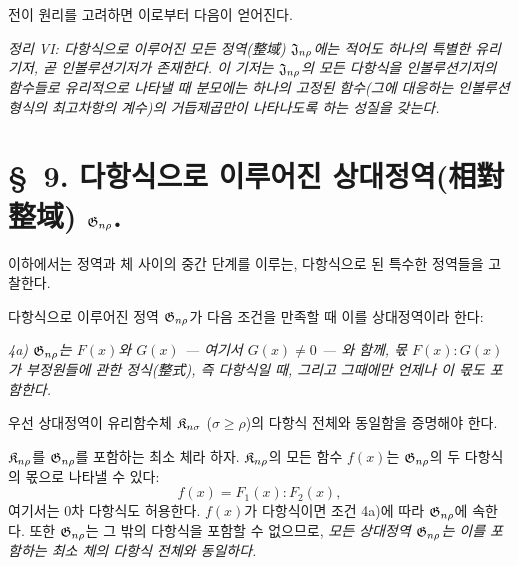 전이 원리를 고려하면 이로부터 다음이 얻어진다.

\emph{정리 VI: 다항식으로 이루어진 모든 정역(整域) $\mathfrak J_{n\rho}$에는 적어도 하나의 특별한 유리기저, 곧 인볼루션기저가 존재한다. 이 기저는 $\mathfrak J_{n\rho}$의 모든 다항식을 인볼루션기저의 함수들로 유리적으로 나타낼 때 분모에는 하나의 고정된 함수(그에 대응하는 인볼루션형식의 최고차항의 계수)의 거듭제곱만이 나타나도록 하는 성질을 갖는다.}

\section*{\S\ 9. 다항식으로 이루어진 상대정역(相對整域) $\mathfrak G_{n\rho}$.}

이하에서는 정역과 체 사이의 중간 단계를 이루는, 다항식으로 된 특수한 정역들을 고찰한다.

다항식으로 이루어진 정역 $\mathfrak G_{n\rho}$가 다음 조건을 만족할 때 이를 
\glqq{}상대정역\grqq{}이라 한다:

\emph{4a) $\mathfrak G_{n\rho}$는 $F(x)$와 $G(x)$ --- 여기서 $G(x)\ne0$ --- 와 함께, 몫 $F(x):G(x)$가 부정원들에 관한 정식(整式), 즉 다항식일 때, 그리고 그때에만 언제나 이 몫도 포함한다.}

우선 상대정역이 유리함수체 $\mathfrak K_{n\sigma}$ ($\sigma\ge \rho$)의 다항식 전체와 동일함을 증명해야 한다.

$\mathfrak K_{n\rho}$를 $\mathfrak G_{n\rho}$를 포함하는 최소 체라 하자. $\mathfrak K_{n\rho}$의 모든 함수 $f(x)$는 $\mathfrak G_{n\rho}$의 두 다항식의 몫으로 나타낼 수 있다:
\[
f(x)=F_1(x):F_2(x),
\]
여기서는 0차 다항식도 허용한다. $f(x)$가 다항식이면 조건 4a)에 따라 $\mathfrak G_{n\rho}$에 속한다. 또한 $\mathfrak G_{n\rho}$는 그 밖의 다항식을 포함할 수 없으므로, \emph{모든 상대정역 $\mathfrak G_{n\rho}$는 이를 포함하는 최소 체의 다항식 전체와 동일하다.}

